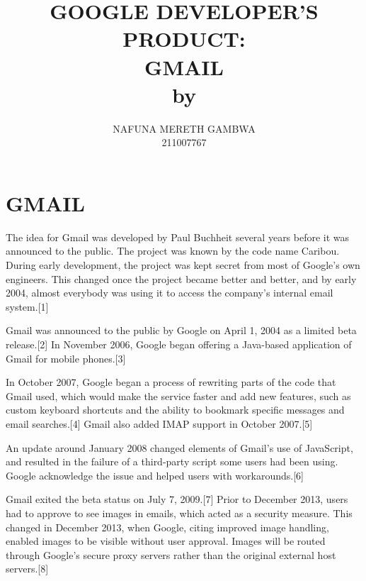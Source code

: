 \documentclass[]{article}
\title{GOOGLE DEVELOPER'S PRODUCT:\\GMAIL\\by}
\author{NAFUNA MERETH GAMBWA\\211007767}
\begin{document}
\maketitle

\section{ GMAIL}
The idea for Gmail was developed by Paul Buchheit several years before it was announced to the public. The project was known by the code name Caribou. During early development, the project was kept secret from most of Google's own engineers. This changed once the project became better and better, and by early 2004, almost everybody was using it to access the company's internal email system.[1]

Gmail was announced to the public by Google on April 1, 2004 as a limited beta release.[2] In November 2006, Google began offering a Java-based application of Gmail for mobile phones.[3]

In October 2007, Google began a process of rewriting parts of the code that Gmail used, which would make the service faster and add new features, such as custom keyboard shortcuts and the ability to bookmark specific messages and email searches.[4] Gmail also added IMAP support in October 2007.[5]

An update around January 2008 changed elements of Gmail's use of JavaScript, and resulted in the failure of a third-party script some users had been using. Google acknowledge the issue and helped users with workarounds.[6]

Gmail exited the beta status on July 7, 2009.[7] Prior to December 2013, users had to approve to see images in emails, which acted as a security measure. This changed in December 2013, when Google, citing improved image handling, enabled images to be visible without user approval. Images will be routed through Google's secure proxy servers rather than the original external host servers.[8] 
\end{document}
